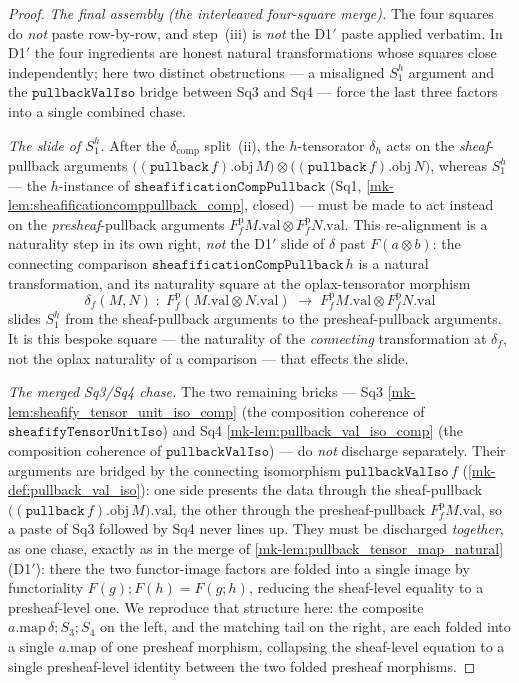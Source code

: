 \begin{proof}
  \emph{The final assembly (the interleaved four-square merge).} The four squares do \emph{not}
  paste row-by-row, and step~(iii) is \emph{not} the D1$'$ paste applied verbatim. In D1$'$
  the four ingredients are honest natural transformations whose squares close independently;
  here two distinct obstructions --- a misaligned \(S_1^{h}\) argument and the
  \(\mathtt{pullbackValIso}\) bridge between Sq3 and Sq4 --- force the last three factors into
  a single combined chase.

  \emph{The slide of \(S_1^{h}\).} After the \(\delta_{\mathrm{comp}}\) split~(ii), the
  \(h\)-tensorator \(\delta_h\) acts on the \emph{sheaf}-pullback arguments
  \(\bigl((\mathtt{pullback}\,f).\mathrm{obj}\,M\bigr) \otimes
  \bigl((\mathtt{pullback}\,f).\mathrm{obj}\,N\bigr)\), whereas \(S_1^{h}\) --- the
  \(h\)-instance of \(\mathtt{sheafificationCompPullback}\) (Sq1,
  \ref{mk-lem:sheafificationcomppullback_comp}, closed) --- must be made to act instead on the
  \emph{presheaf}-pullback arguments \(F^{\mathrm p}_{f}M.\mathrm{val} \otimes
  F^{\mathrm p}_{f}N.\mathrm{val}\). This re-alignment is a naturality step in its own right,
  \emph{not} the D1$'$ slide of \(\delta\) past \(F(a\otimes b)\): the connecting comparison
  \(\mathtt{sheafificationCompPullback}\,h\) is a natural transformation, and its naturality
  square at the oplax-tensorator morphism
  \[
    \delta_{f}(M,N) \;:\;
      F^{\mathrm p}_{f}(M.\mathrm{val} \otimes N.\mathrm{val})
      \;\longrightarrow\;
      F^{\mathrm p}_{f}M.\mathrm{val} \otimes F^{\mathrm p}_{f}N.\mathrm{val}
  \]
  slides \(S_1^{h}\) from the sheaf-pullback arguments to the presheaf-pullback arguments.
  It is this bespoke square --- the naturality of the \emph{connecting} transformation at
  \(\delta_f\), not the oplax naturality of a comparison --- that effects the slide.

  \emph{The merged Sq3/Sq4 chase.} The two remaining bricks --- Sq3
  \ref{mk-lem:sheafify_tensor_unit_iso_comp} (the composition coherence of
  \(\mathtt{sheafifyTensorUnitIso}\)) and Sq4 \ref{mk-lem:pullback_val_iso_comp} (the
  composition coherence of \(\mathtt{pullbackValIso}\)) --- do \emph{not} discharge
  separately. Their arguments are bridged by the connecting isomorphism
  \(\mathtt{pullbackValIso}\,f\) (\ref{mk-def:pullback_val_iso}): one side presents the data
  through the sheaf-pullback \(\bigl((\mathtt{pullback}\,f).\mathrm{obj}\,M\bigr).\mathrm{val}\),
  the other through the presheaf-pullback \(F^{\mathrm p}_{f}M.\mathrm{val}\), so a paste of
  Sq3 followed by Sq4 never lines up. They must be discharged \emph{together}, as one chase,
  exactly as in the merge of \ref{mk-lem:pullback_tensor_map_natural} (D1$'$): there the two
  functor-image factors are folded into a single image by functoriality
  \(F(g)\mathbin{;}F(h)=F(g\mathbin{;}h)\), reducing the sheaf-level equality to a
  presheaf-level one. We reproduce that structure here: the composite
  \(a.\mathrm{map}\,\delta \mathbin{;} S_3 \mathbin{;} S_4\) on the left, and the matching
  tail on the right, are each folded into a single \(a.\mathrm{map}\) of one presheaf
  morphism, collapsing the sheaf-level equation to a single presheaf-level identity between
  the two folded presheaf morphisms.


\end{proof}
